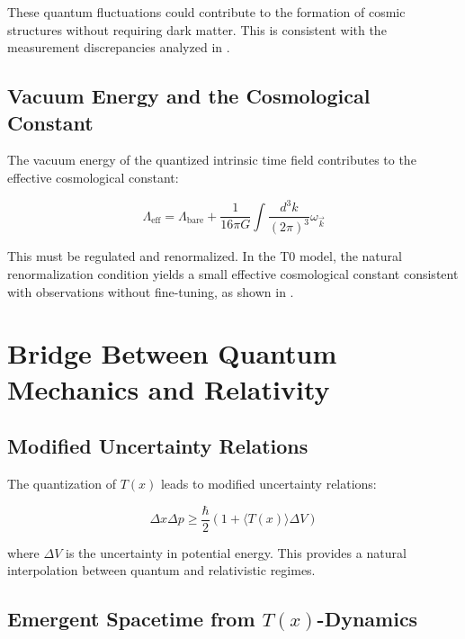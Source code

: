 \documentclass[12pt,a4paper]{article}
\newcommand{\Tfield}{T(x)}
\begin{document}
	These quantum fluctuations could contribute to the formation of cosmic structures without requiring dark matter. This is consistent with the measurement discrepancies analyzed in \cite{pascher_messdifferenzen_2025_en}.
	
	\subsection{Vacuum Energy and the Cosmological Constant}
	\label{sec:vakuumenergie}
	
	The vacuum energy of the quantized intrinsic time field contributes to the effective cosmological constant:
	
	\begin{equation}
		\Lambda_{\text{eff}} = \Lambda_{\text{bare}} + \frac{1}{16\pi G}\int \frac{d^3k}{(2\pi)^3} \omega_{\vec{k}}
	\end{equation}
	
	This must be regulated and renormalized. In the T0 model, the natural renormalization condition yields a small effective cosmological constant consistent with observations without fine-tuning, as shown in \cite{pascher_temp_2025_en}.
	
	\section{Bridge Between Quantum Mechanics and Relativity}
	\label{sec:bruecke_qm_rt}
	
	\subsection{Modified Uncertainty Relations}
	\label{sec:unschaerferelationen}
	
	The quantization of $\Tfield$ leads to modified uncertainty relations:
	
	\begin{equation}
		\Delta x \Delta p \geq \frac{\hbar}{2}\left(1 + \langle \Tfield \rangle \Delta V\right)
	\end{equation}
	
	where $\Delta V$ is the uncertainty in potential energy. This provides a natural interpolation between quantum and relativistic regimes.
	
	\subsection{Emergent Spacetime from $\Tfield$-Dynamics}
	\label{sec:emergente_raumzeit}
	
\end{document}
